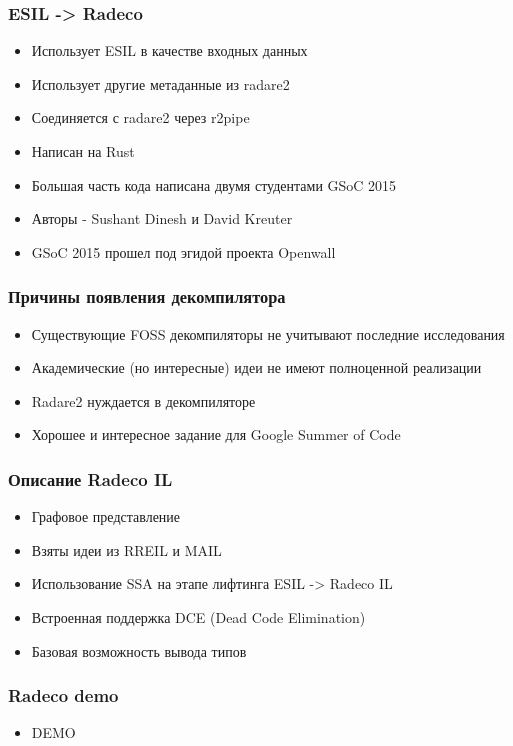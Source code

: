 \documentclass[10pt,pdf,utf8,english,compress,hyperref={unicode}]{beamer}
\begin{document}
\begin{frame}[fragile]
  \frametitle{ESIL -> Radeco }
     \begin{itemize}
        \item Использует ESIL в качестве входных данных
		\item Использует другие метаданные из radare2
		\item Соединяется с radare2 через r2pipe
		\item Написан на Rust
		\item Большая часть кода написана двумя студентами GSoC 2015
		\item Авторы - Sushant Dinesh и David Kreuter 
		\item GSoC 2015 прошел под эгидой проекта Openwall
      \end{itemize}
\end{frame}

\begin{frame}[fragile]
  \frametitle{Причины появления декомпилятора}
     \begin{itemize}
        \item Существующие FOSS декомпиляторы не учитывают последние исследования
		\item Академические (но интересные) идеи не имеют полноценной реализации
		\item Radare2 нуждается в декомпиляторе
		\item Хорошее и интересное задание для Google Summer of Code
      \end{itemize}
\end{frame}

\begin{frame}[fragile]
  \frametitle{Описание Radeco IL}
     \begin{itemize}
        \item Графовое представление
		\item Взяты идеи из RREIL и MAIL
		\item Использование SSA на этапе лифтинга ESIL -> Radeco IL
		\item Встроенная поддержка DCE (Dead Code Elimination)
		\item Базовая возможность вывода типов 
      \end{itemize}
\end{frame}

\begin{frame}[fragile]
  \frametitle{Radeco demo}
     \begin{itemize}
        \item DEMO
      \end{itemize}
\end{frame}
\end{document}
